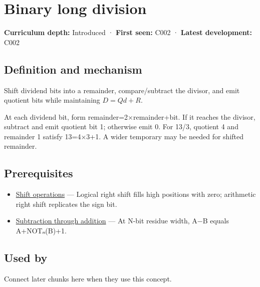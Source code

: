 \hypertarget{appendix-89985e6a2685}{}\label{referencestart:appendix-89985e6a2685}
\section{Binary long division}\label{appendix-89985e6a2685-binary-long-division}

\textbf{Curriculum depth:} Introduced · \textbf{First seen:} C002 · \textbf{Latest development:} C002

\begin{allmightroledefinition}

\subsection{Definition and mechanism}\label{appendix-89985e6a2685-definition-and-mechanism}

Shift dividend bits into a remainder, compare/subtract the divisor, and emit quotient bits while maintaining \(D=Qd+R\).

\end{allmightroledefinition}

At each dividend bit, form remainder=2×remainder+bit. If it reaches the divisor, subtract and emit quotient bit 1; otherwise emit 0. For 13/3, quotient 4 and remainder 1 satisfy 13=4×3+1. A wider temporary may be needed for shifted remainder.

\subsection{Prerequisites}\label{appendix-89985e6a2685-prerequisites}

\begin{itemize}
\tightlist
\item
  \hyperref[appendix-73425b25118e]{Shift operations} --- Logical right shift fills high positions with zero; arithmetic right shift replicates the sign bit.
\item
  \hyperref[appendix-1c7df340573e]{Subtraction through addition} --- At N-bit residue width, A−B equals A+NOTₙ(B)+1.
\end{itemize}

\subsection{Used by}\label{appendix-89985e6a2685-used-by}

Connect later chunks here when they use this concept.

